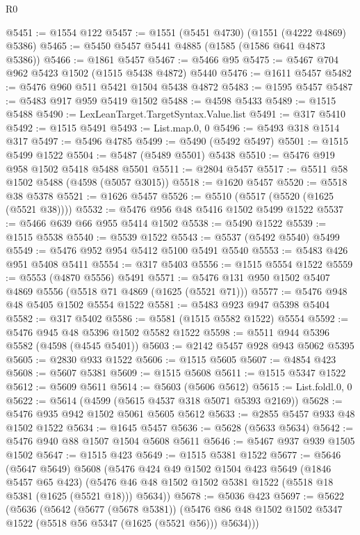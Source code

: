 \begin{lexlean}{R0}
\begin{coremodule}
@5451 := @1554 @122
@5457 := @1551 (@5451 @4730) (@1551 (@4222 @4869) @5386)
@5465 := @5450 @5457 @5441 @4885 (@1585 (@1586 @641 @4873 @5386))
@5466 := @1861 @5457
@5467 := @5466 @95
@5475 := @5467 @704 @962 @5423 @1502 (@1515 @5438 @4872) @5440
@5476 := @1611 @5457
@5482 := @5476 @960 @511 @5421 @1504 @5438 @4872
@5483 := @1595 @5457
@5487 := @5483 @917 @959 @5419 @1502
@5488 := @4598 @5433
@5489 := @1515 @5488
@5490 := LexLeanTarget.TargetSyntax.Value.list
@5491 := @317 @5410
@5492 := @1515 @5491
@5493 := List.map.{0, 0}
@5496 := @5493 @318 @1514 @317
@5497 := @5496 @4785
@5499 := @5490 (@5492 @5497)
@5501 := @1515 @5499 @1522
@5504 := @5487 (@5489 @5501) @5438
@5510 := @5476 @919 @958 @1502 @5418 @5488 @5501
@5511 := @2804 @5457
@5517 := @5511 @58 @1502 @5488 (@4598 (@5057 @3015))
@5518 := @1620 @5457
@5520 := @5518 @38 @5378
@5521 := @1626 @5457
@5526 := @5510 (@5517 (@5520 (@1625 (@5521 @38))))
@5532 := @5476 @956 @48 @5416 @1502 @5499 @1522
@5537 := @5466 @639 @66 @955 @5414 @1502
@5538 := @5490 @1522
@5539 := @1515 @5538
@5540 := @5539 @1522
@5543 := @5537 (@5492 @5540) @5499
@5549 := @5476 @952 @954 @5412 @5100 @5491 @5540
@5553 := @5483 @426 @951 @5408 @5411
@5554 := @317 @5403
@5556 := @1515 @5554 @1522
@5559 := @5553 (@4870 @5556) @5491
@5571 := @5476 @131 @950 @1502 @5407 @4869 @5556 (@5518 @71 @4869 (@1625 (@5521 @71)))
@5577 := @5476 @948 @48 @5405 @1502 @5554 @1522
@5581 := @5483 @923 @947 @5398 @5404
@5582 := @317 @5402
@5586 := @5581 (@1515 @5582 @1522) @5554
@5592 := @5476 @945 @48 @5396 @1502 @5582 @1522
@5598 := @5511 @944 @5396 @5582 (@4598 (@4545 @5401))
@5603 := @2142 @5457 @928 @943 @5062 @5395
@5605 := @2830 @933 @1522
@5606 := @1515 @5605
@5607 := @4854 @423
@5608 := @5607 @5381
@5609 := @1515 @5608
@5611 := @1515 @5347 @1522
@5612 := @5609 @5611
@5614 := @5603 (@5606 @5612)
@5615 := List.foldl.{0, 0}
@5622 := @5614 (@4599 (@5615 @4537 @318 @5071 @5393 @2169))
@5628 := @5476 @935 @942 @1502 @5061 @5605 @5612
@5633 := @2855 @5457 @933 @48 @1502 @1522
@5634 := @1645 @5457
@5636 := @5628 (@5633 @5634)
@5642 := @5476 @940 @88 @1507 @1504 @5608 @5611
@5646 := @5467 @937 @939 @1505 @1502
@5647 := @1515 @423
@5649 := @1515 @5381 @1522
@5677 := @5646
    (@5647 @5649)
    @5608
    (@5476
      @424
      @49
      @1502
      @1504
      @423
      @5649
      (@1846 @5457 @65 @423)
      (@5476 @46 @48 @1502 @1502 @5381 @1522 (@5518 @18 @5381 (@1625 (@5521 @18))) @5634))
@5678 := @5036 @423
@5697 := @5622
    (@5636
      (@5642
        (@5677 (@5678 @5381))
        (@5476 @86 @48 @1502 @1502 @5347 @1522 (@5518 @56 @5347 (@1625 (@5521 @56))) @5634)))

\end{coremodule}
\end{lexlean}
